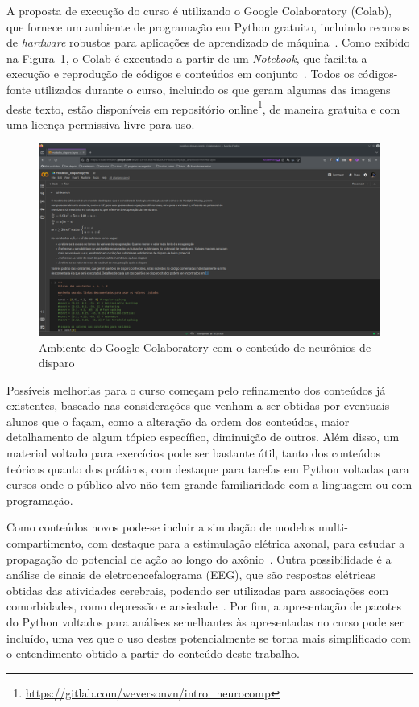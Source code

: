 A proposta de execução do curso é utilizando o Google Colaboratory (Colab), que fornece um ambiente de programação em Python gratuito, incluindo recursos de \textit{hardware} robustos para aplicações de aprendizado de máquina~\cite{bisong_google_2019}. Como exibido na Figura~\ref{fig:colab}, o Colab é executado a partir de um \textit{Notebook}, que facilita a execução e reprodução de códigos e conteúdos em conjunto~\cite{shen_interactive_2014}. Todos os códigos-fonte utilizados durante o curso, incluindo os que geram algumas das imagens deste texto, estão disponíveis em repositório online\footnote{\url{https://gitlab.com/weversonvn/intro_neurocomp}}, de maneira gratuita e com uma licença permissiva livre para uso.
\begin{figure}[tb]
	\centering
	\caption[Ambiente do Google Colaboratory com o conteúdo de neurônios de disparo]{Ambiente do Google Colaboratory com o conteúdo de neurônios de disparo}
	\label{fig:colab}
	\includegraphics[width=0.7\linewidth]{figs/colab}
\end{figure}

Possíveis melhorias para o curso começam pelo refinamento dos conteúdos já existentes, baseado nas considerações que venham a ser obtidas por eventuais alunos que o façam, como a alteração da ordem dos conteúdos, maior detalhamento de algum tópico específico, diminuição de outros. Além disso, um material voltado para exercícios pode ser bastante útil, tanto dos conteúdos teóricos quanto dos práticos, com destaque para tarefas em Python voltadas para cursos onde o público alvo não tem grande familiaridade com a linguagem ou com programação.

Como conteúdos novos pode-se incluir a simulação de modelos multi-compartimento, com destaque para a estimulação elétrica axonal, para estudar a propagação do potencial de ação ao longo do axônio~\cite{rattay_model_2001}. Outra possibilidade é a análise de sinais de eletroencefalograma (EEG), que são respostas elétricas obtidas das atividades cerebrais, podendo ser utilizadas para associações com comorbidades, como depressão e ansiedade~\cite{cavanagh_multiple_2019}. Por fim, a apresentação de pacotes do Python voltados para análises semelhantes às apresentadas no curso pode ser incluído, uma vez que o uso destes potencialmente se torna mais simplificado com o entendimento obtido a partir do conteúdo deste trabalho.
